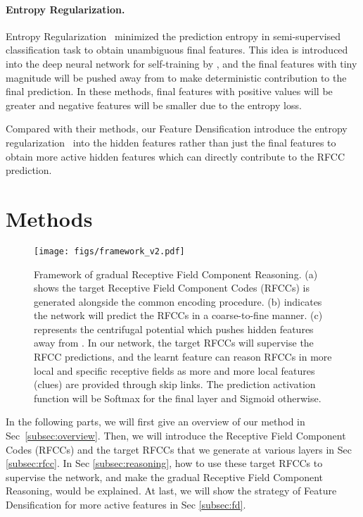 \documentclass[final]{cvpr}
\begin{document}
\paragraph{Entropy Regularization.}
Entropy Regularization~\cite{grandvalet2005semi} minimized the prediction entropy in semi-supervised classification task to obtain unambiguous final features. This idea is introduced into the deep neural network for self-training by \cite{lee2013pseudo}, and the final features with tiny magnitude will be pushed away from  to make deterministic contribution to the final prediction. In these methods, final features with positive values will be greater and negative features will be smaller due to the entropy loss. 

Compared with their methods, our Feature Densification introduce the entropy regularization~\cite{grandvalet2005semi,lee2013pseudo} into the hidden features rather than just the final features to obtain more active hidden features which can directly contribute to the RFCC prediction.

\section{Methods}
\label{sec:methods}

\begin{figure*}[th]
    \centering
    \texttt{[image: figs/framework\_v2.pdf]}
    \caption{Framework of gradual Receptive Field Component Reasoning. (a) shows the target Receptive Field Component Codes (RFCCs) is generated alongside the common encoding procedure. (b) indicates the network will predict the RFCCs in a coarse-to-fine manner. (c) represents the centrifugal potential which pushes hidden features away from . In our network, the target RFCCs will supervise the RFCC predictions, and the learnt feature can reason RFCCs in more local and specific receptive fields as more and more local features (clues) are provided through skip links. The prediction activation function will be Softmax for the final layer and Sigmoid otherwise.}
    \label{fig:framework}
\end{figure*}

In the following parts, we will first give an overview of our method in Sec~\ref{subsec:overview}. Then, we will introduce the Receptive Field Component Codes (RFCCs) and the target RFCCs that we generate at various layers in Sec \ref{subsec:rfcc}. In Sec \ref{subsec:reasoning}, how to use these target RFCCs to supervise the network, and make the gradual Receptive Field Component Reasoning, would be explained. At last, we will show the strategy of Feature Densification for more active features in Sec \ref{subsec:fd}.
\end{document}
